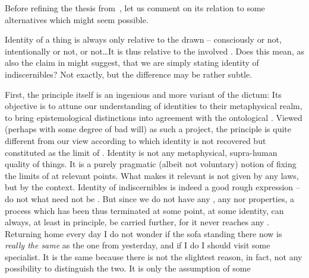 Before refining the thesis from~, let us comment on its relation to
some alternatives which might seem possible.



\pa \label{ft:identidiscern} Identity of a thing is always only relative to the
drawn  -- consciously or not, intentionally or not,
 or not\ldots It is thus relative to the involved .
Does this mean, as also the claim in  might suggest, that we
are simply stating identity of indiscernibles? Not exactly, but the difference
may be rather subtle.

First, the principle itself is an ingenious and more  variant of the
dictum:  Its objective is to attune our understanding of
identities to their metaphysical realm, to bring epistemological distinctions
into agreement with the ontological .  Viewed (perhaps with some
degree of bad will) as such a project, the principle is quite different from our
view according to which identity is not recovered but constituted as the limit
of .  Identity is not any metaphysical, supra-human quality of
things.  It is a purely pragmatic (albeit not voluntary) notion of fixing the
limits of  at relevant points.  What makes it relevant is not
given by any laws, but by the context.  Identity of indiscernibles is indeed a
good rough expression -- do not  what need not be
.  But since we do not have any , any
 nor  properties, a process which has been thus
terminated at some point, at some identity, can always, at least in principle,
be carried further, for it never reaches any .
Returning home every day I do not wonder if the sofa standing there now is {\em
  really the same} as the one from yesterday, and if I do I should visit some
specialist. It is the same because there is not the slightest reason, in fact,
not any possibility to distinguish the two. It is only the assumption of some
